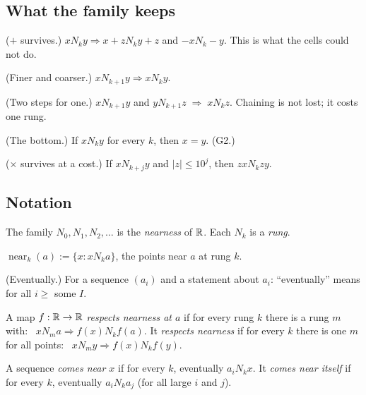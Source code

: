\subsection*{What the family keeps}

\begin{lines}
\item[\lab{P9}] ($+$ survives.) $x \mathrel{N_k} y \Rightarrow x + z \mathrel{N_k} y + z$ and $-x \mathrel{N_k} -y$. This is what the cells could not do.
\item[\lab{P10}] (Finer and coarser.) $x \mathrel{N_{k+1}} y \Rightarrow x \mathrel{N_k} y$.
\item[\lab{P11}] (Two steps for one.) $x \mathrel{N_{k+1}} y$ and $y \mathrel{N_{k+1}} z \;\Rightarrow\; x \mathrel{N_k} z$. Chaining is not lost; it costs one rung.
\item[\lab{P12}] (The bottom.) If $x \mathrel{N_k} y$ for every $k$, then $x = y$. (G2.)
\item[\lab{P13}] ($\times$ survives at a cost.) If $x \mathrel{N_{k+j}} y$ and $|z| \le 10^{j}$, then $z x \mathrel{N_k} z y$.
\end{lines}

\subsection*{Notation}

\begin{lines}
\item[\lab{N1}] The family $N_0, N_1, N_2, \dots$ is the \emph{nearness} of $\mathbb{R}$. Each $N_k$ is a \emph{rung}.
\item[\lab{N2}] $\operatorname{near}_k(a) := \{x : x \mathrel{N_k} a\}$, the points near $a$ at rung $k$.
\item[\lab{N3}] (Eventually.) For a sequence $(a_i)$ and a statement about $a_i$: ``eventually'' means for all $i \ge$ some $I$.
\item[\lab{N4}] A map $f : \mathbb{R} \to \mathbb{R}$ \emph{respects nearness at $a$} if for every rung $k$ there is a rung $m$ with: \ $x \mathrel{N_m} a \Rightarrow f(x) \mathrel{N_k} f(a)$. It \emph{respects nearness} if for every $k$ there is one $m$ for all points: \ $x \mathrel{N_m} y \Rightarrow f(x) \mathrel{N_k} f(y)$.
\item[\lab{N5}] A sequence \emph{comes near $x$} if for every $k$, eventually $a_i \mathrel{N_k} x$. It \emph{comes near itself} if for every $k$, eventually $a_i \mathrel{N_k} a_j$ (for all large $i$ and $j$).
\end{lines}

